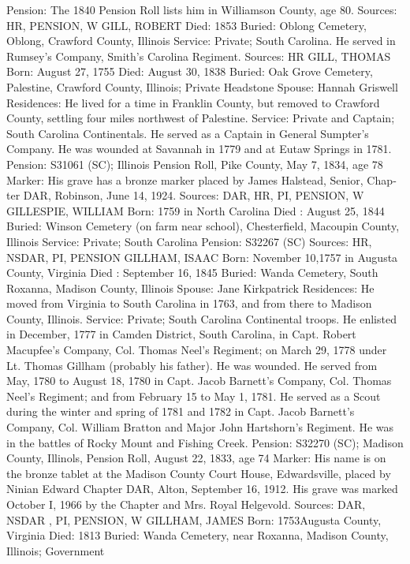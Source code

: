 Pension: The 1840 Pension Roll lists him in Williamson County, age 80. 
Sources: HR, PENSION, W 
GILL, ROBERT 
Died: 1853 
Buried: Oblong Cemetery, Oblong, Crawford County, Illinois
Service: Private; South Carolina. He served in Rumsey's Company, Smith's Carolina Regiment. 
Sources: HR 
GILL, THOMAS 
Born: August 27, 1755 
Died: August 30, 1838 Buried: Oak Grove Cemetery, Palestine, Crawford County, Illinois; Private Head­stone 
Spouse: Hannah Griswell 
Residences: He lived for a time in Franklin County, but removed to Crawford County, settling four miles northwest of Palestine. 
Service: Private and Captain; South Carolina Continentals. He served as a Cap­tain in General Sumpter's Company. He was wounded at Savannah in 1779 and at Eutaw Springs in 1781. 
Pension: S31061 (SC); Illinois Pension Roll, Pike County, May 7, 1834, age 78 
Marker: His grave has a bronze marker placed by James Halstead, Senior, Chap­ter DAR, Robinson, June 14, 1924. 
Sources: DAR, HR, PI, PENSION, W 
GILLESPIE, WILLIAM 
Born: 1759 in North Carolina 
Died : August 25, 1844 
Buried: Winson Cemetery (on farm near school), Chesterfield, Macoupin County, Illinois 
Service: Private; South Carolina 
Pension: S32267 (SC) 
Sources: HR, NSDAR, PI, PENSION 
GILLHAM, ISAAC 
Born: November 10,1757 in Augusta County, Virginia 
Died : September 16, 1845 
Buried: Wanda Cemetery, South Roxanna, Madison County, Illinois 
Spouse: Jane Kirkpatrick 
Residences: He moved from Virginia to South Carolina in 1763, and from there to Madison County, Illinois. 
Service: Private; South Carolina Continental troops. He enlisted in December, 1777 in Camden District, South Carolina, in Capt. Robert Macupfee's Com­pany, Col. Thomas Neel's Regiment; on March 29, 1778 under Lt. Thomas Gillham (probably his father). He was wounded. He served from May, 1780 to August 18, 1780 in Capt. Jacob Barnett's Company, Col. Thomas Neel's Regiment; and from February 15 to May 1, 1781. He served as a Scout during the winter and spring of 1781 and 1782 in Capt. Jacob Barnett's Company, Col. William Bratton and Major John Hartshorn's Regiment. He was in the battles of Rocky Mount and Fishing Creek. 
Pension: S32270 (SC); Madison County, Illinols, Pension Roll, August 22, 1833, age 74 
Marker: His name is on the bronze tablet at the Madison County Court House, Edwardsville, placed by Ninian Edward Chapter DAR, Alton, September 16, 1912. His grave was marked October I, 1966 by the Chapter and Mrs. Royal Helgevold. 
Sources: DAR, NSDAR , PI, PENSION, W 
GILLHAM, JAMES 
Born: 1753Augusta County, Virginia 
Died: 1813 
Buried: Wanda Cemetery, near Roxanna, Madison County, Illinois; Government 
